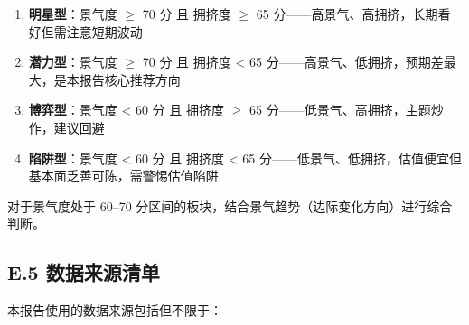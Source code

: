 \begin{enumerate}[leftmargin=2em]
\item \textbf{明星型}：景气度 $\geq$ 70 分 且 拥挤度 $\geq$ 65 分------高景气、高拥挤，长期看好但需注意短期波动
\item \textbf{潜力型}：景气度 $\geq$ 70 分 且 拥挤度 < 65 分------高景气、低拥挤，预期差最大，是本报告核心推荐方向
\item \textbf{博弈型}：景气度 < 60 分 且 拥挤度 $\geq$ 65 分------低景气、高拥挤，主题炒作，建议回避
\item \textbf{陷阱型}：景气度 < 60 分 且 拥挤度 < 65 分------低景气、低拥挤，估值便宜但基本面乏善可陈，需警惕估值陷阱
\end{enumerate}

对于景气度处于 60--70 分区间的板块，结合景气趋势（边际变化方向）进行综合判断。

\subsection{E.5 数据来源清单}

本报告使用的数据来源包括但不限于：

